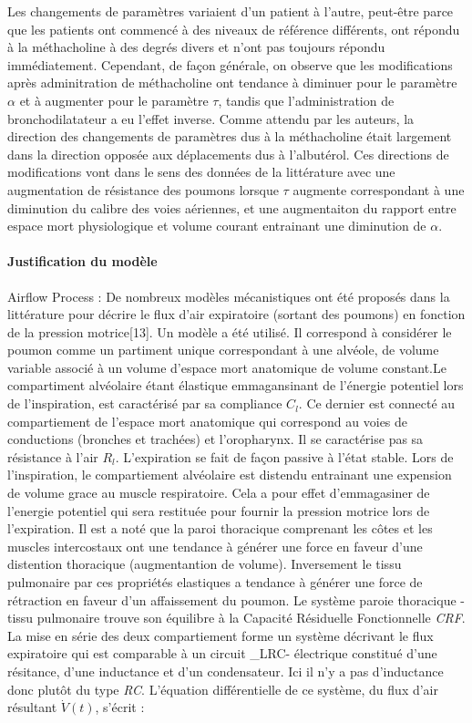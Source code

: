 \documentclass[12pt,]{article}
\let\oldparagraph\paragraph
\renewcommand{\paragraph}[1]{\oldparagraph{#1}\mbox{}}
\begin{document}
Les changements de paramètres variaient d'un patient à l'autre,
peut-être parce que les patients ont commencé à des niveaux de référence
différents, ont répondu à la méthacholine à des degrés divers et n'ont
pas toujours répondu immédiatement. Cependant, de façon générale, on
observe que les modifications après adminitration de méthacholine ont
tendance à diminuer pour le paramètre \(\alpha\) et à augmenter pour le
paramètre \(\tau\), tandis que l'administration de bronchodilatateur a
eu l'effet inverse. Comme attendu par les auteurs, la direction des
changements de paramètres dus à la méthacholine était largement dans la
direction opposée aux déplacements dus à l'albutérol. Ces directions de
modifications vont dans le sens des données de la littérature avec une
augmentation de résistance des poumons lorsque \(\tau\) augmente
correspondant à une diminution du calibre des voies aériennes, et une
augmentaiton du rapport entre espace mort physiologique et volume
courant entrainant une diminution de \(\alpha\).

\hypertarget{justification-du-moduxe8le}{%
\paragraph{Justification du modèle}\label{justification-du-moduxe8le}}

Airflow Process : De nombreux modèles mécanistiques ont été proposés
dans la littérature pour décrire le flux d'air expiratoire (sortant des
poumons) en fonction de la pression motrice{[}13{]}. Un modèle a été
utilisé. Il correspond à considérer le poumon comme un partiment unique
correspondant à une alvéole, de volume variable associé à un volume
d'espace mort anatomique de volume constant.Le compartiment alvéolaire
étant élastique emmagansinant de l'énergie potentiel lors de
l'inspiration, est caractérisé par sa compliance \(C_{l}\). Ce dernier
est connecté au compartiement de l'espace mort anatomique qui correspond
au voies de conductions (bronches et trachées) et l'oropharynx. Il se
caractérise pas sa résistance à l'air \(R_{l}\). L'expiration se fait de
façon passive à l'état stable. Lors de l'inspiration, le compartiement
alvéolaire est distendu entrainant une expension de volume grace au
muscle respiratoire. Cela a pour effet d'emmagasiner de l'energie
potentiel qui sera restituée pour fournir la pression motrice lors de
l'expiration. Il est a noté que la paroi thoracique comprenant les côtes
et les muscles intercostaux ont une tendance à générer une force en
faveur d'une distention thoracique (augmentantion de volume).
Inversement le tissu pulmonaire par ces propriétés elastiques a tendance
à générer une force de rétraction en faveur d'un affaissement du poumon.
Le système paroie thoracique - tissu pulmonaire trouve son équilibre à
la Capacité Résiduelle Fonctionnelle \emph{CRF}. La mise en série des
deux compartiement forme un système décrivant le flux expiratoire qui
est comparable à un circuit \_LRC- électrique constitué d'une résitance,
d'une inductance et d'un condensateur. Ici il n'y a pas d'inductance
donc plutôt du type \emph{RC}. L'équation différentielle de ce système,
du flux d'air résultant \(\dot{V}(t)\), s'écrit :
\end{document}
